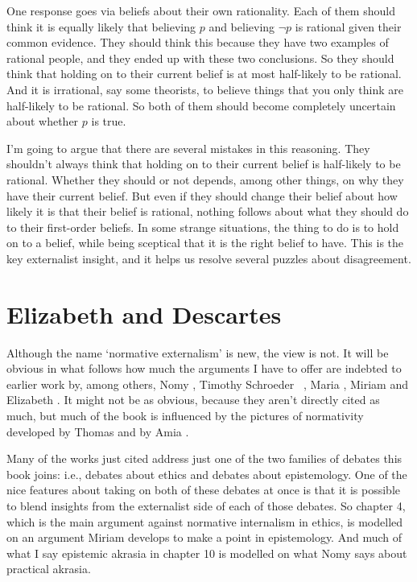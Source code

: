 One response goes via beliefs about their own rationality. Each of them should think it is equally likely that believing $p$ and believing $\neg p$ is rational given their common evidence. They should think this because they have two examples of rational people, and they ended up with these two conclusions. So they should think that holding on to their current belief is at most half-likely to be rational. And it is irrational, say some theorists, to believe things that you only think are half-likely to be rational. So both of them should become completely uncertain about whether $p$ is true.

I'm going to argue that there are several mistakes in this reasoning. They shouldn't always think that holding on to their current belief is half-likely to be rational. Whether they should or not depends, among other things, on why they have their current belief. But even if they should change their belief about how likely it is that their belief is rational, nothing follows about what they should do to their first-order beliefs. In some strange situations, the thing to do is to hold on to a belief, while being sceptical that it is the right belief to have. This is the key externalist insight, and it helps us resolve several puzzles about disagreement.

\section{Elizabeth and Descartes}
\label{elizabethanddescartes}

Although the name `normative externalism' is new, the view is not. It will be obvious in what follows how much the arguments I have to offer are indebted to earlier work by, among others, Nomy \citet{Arpaly2003}, Timothy Schroeder ~\citep{ArpalySchroeder2014}, Maria \citet{Lasonen-Aarnio2010, Lasonen-Aarnio2014}, Miriam \citet{Schoenfield2014} and Elizabeth \citet{Harman2011a, Harman2014}. It might not be as obvious, because they aren't directly cited as much, but much of the book is influenced by the pictures of normativity developed by Thomas \citet{Kelly2005} and by Amia \citet{Srinivasan2015b}.

Many of the works just cited address just one of the two families of debates this book joins: i.e., debates about ethics and debates about epistemology. One of the nice features about taking on both of these debates at once is that it is possible to blend insights from the externalist side of each of those debates. So chapter 4, which is the main argument against normative internalism in ethics, is modelled on an argument Miriam \citet{Schoenfield2014} develops to make a point in epistemology. And much of what I say epistemic akrasia in chapter 10 is modelled on what Nomy \citet{Arpaly2003} says about practical akrasia.

